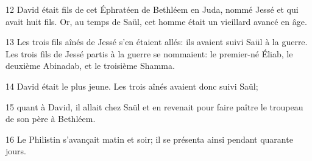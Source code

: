 
12 David était fils de cet Éphratéen de Bethléem en Juda, nommé Jessé et qui avait huit fils. Or, au temps de Saül, cet homme était un vieillard avancé en âge.

13 Les trois fils aînés de Jessé s’en étaient allés: ils avaient suivi Saül à la guerre. Les trois fils de Jessé partis à la guerre se nommaient: le premier-né Éliab, le deuxième Abinadab, et le troisième Shamma.

14 David était le plus jeune. Les trois aînés avaient donc suivi Saül;

15 quant à David, il allait chez Saül et en revenait pour faire paître le troupeau de son père à Bethléem.

16 Le Philistin s’avançait matin et soir; il se présenta ainsi pendant quarante jours.